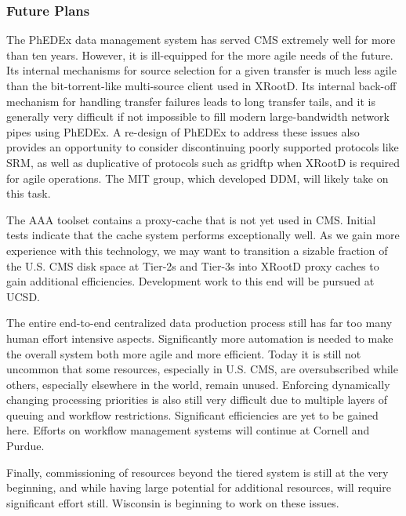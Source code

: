 \documentclass[11pt,a4paper]{article}
\begin{document}

\subsubsection{Future Plans}

The PhEDEx data management system has served CMS extremely well for more
than ten years.  However, it is ill-equipped for the more agile needs of
the future. Its internal mechanisms for source selection for a given
transfer is much less agile than the bit-torrent-like multi-source client
used in XRootD. Its internal back-off mechanism for handling transfer
failures leads to long transfer tails, and it is generally very difficult
if not impossible to fill modern large-bandwidth network pipes using
PhEDEx.  A re-design of PhEDEx to address these issues also provides an
opportunity to consider discontinuing poorly supported protocols like SRM,
as well as duplicative of protocols such as gridftp when XRootD is required
for agile operations.  The MIT group, which developed DDM, will likely take
on this task.

The AAA toolset contains a proxy-cache that is not yet used in CMS.
Initial tests indicate that the cache system performs exceptionally
well. As we gain more experience with this technology, we may want to
transition a sizable fraction of the U.S. CMS disk space at Tier-2s and
Tier-3s into XRootD proxy caches to gain additional efficiencies.
Development work to this end will be pursued at UCSD.

The entire end-to-end centralized data production process still has far too
many human effort intensive aspects.  Significantly more automation is
needed to make the overall system both more agile and more efficient. Today
it is still not uncommon that some resources, especially in U.S. CMS, are
oversubscribed while others, especially elsewhere in the world, remain
unused.  Enforcing dynamically changing processing priorities is also still
very difficult due to multiple layers of queuing and workflow
restrictions. Significant efficiencies are yet to be gained here.  Efforts
on workflow management systems will continue at Cornell and Purdue.

Finally, commissioning of resources beyond the tiered system is still at
the very beginning, and while having large potential for additional
resources, will require significant effort still.  Wisconsin is beginning
to work on these issues.
\end{document}
